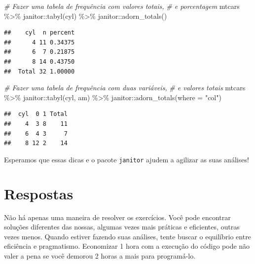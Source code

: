 \documentclass[
]{book}
\newenvironment{Shaded}{\begin{snugshade}}{\end{snugshade}}
\newcommand{\AttributeTok}[1]{\textcolor[rgb]{0.77,0.63,0.00}{#1}}
\newcommand{\CommentTok}[1]{\textcolor[rgb]{0.56,0.35,0.01}{\textit{#1}}}
\newcommand{\FunctionTok}[1]{\textcolor[rgb]{0.00,0.00,0.00}{#1}}
\newcommand{\NormalTok}[1]{#1}
\newcommand{\SpecialCharTok}[1]{\textcolor[rgb]{0.00,0.00,0.00}{#1}}
\newcommand{\StringTok}[1]{\textcolor[rgb]{0.31,0.60,0.02}{#1}}
\begin{document}
\begin{Shaded}
\begin{Highlighting}[]
\CommentTok{\# Fazer uma tabela de frequência com valores totais,}
\CommentTok{\# e porcentagem}
\NormalTok{mtcars }\SpecialCharTok{\%\textgreater{}\%} 
\NormalTok{  janitor}\SpecialCharTok{::}\FunctionTok{tabyl}\NormalTok{(cyl) }\SpecialCharTok{\%\textgreater{}\%} 
\NormalTok{  janitor}\SpecialCharTok{::}\FunctionTok{adorn\_totals}\NormalTok{()}
\end{Highlighting}
\end{Shaded}

\begin{verbatim}
##    cyl  n percent
##      4 11 0.34375
##      6  7 0.21875
##      8 14 0.43750
##  Total 32 1.00000
\end{verbatim}

\begin{Shaded}
\begin{Highlighting}[]
\CommentTok{\# Fazer uma tabela de frequência com duas variáveis,}
\CommentTok{\# e valores totais}
\NormalTok{mtcars }\SpecialCharTok{\%\textgreater{}\%} 
\NormalTok{  janitor}\SpecialCharTok{::}\FunctionTok{tabyl}\NormalTok{(cyl, am) }\SpecialCharTok{\%\textgreater{}\%} 
\NormalTok{  janitor}\SpecialCharTok{::}\FunctionTok{adorn\_totals}\NormalTok{(}\AttributeTok{where =} \StringTok{"col"}\NormalTok{)}
\end{Highlighting}
\end{Shaded}

\begin{verbatim}
##  cyl  0 1 Total
##    4  3 8    11
##    6  4 3     7
##    8 12 2    14
\end{verbatim}

Esperamos que essas dicas e o pacote \texttt{janitor} ajudem a agilizar as suas análises!

\hypertarget{respostas}{%
\chapter{Respostas}\label{respostas}}

Não há apenas uma maneira de resolver os exercícios. Você pode encontrar soluções diferentes das nossas, algumas vezes mais práticas e eficientes, outras vezes menos. Quando estiver fazendo suas análises, tente buscar o equilíbrio entre eficiência e pragmatismo. Economizar 1 hora com a execução do código pode não valer a pena se você demorou 2 horas a mais para programá-lo.
\end{document}
